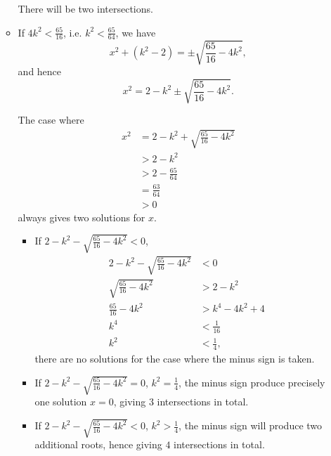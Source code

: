 \begin{enumerate}
\begin{itemize}
                    There will be two intersections.

              \item If \(4k^2 < \frac{65}{16}\), i.e. \(k^2 < \frac{65}{64}\), we have
                    \[
                        x^2 + (k^2 - 2) = \pm \sqrt{\frac{65}{16} - 4k^2},
                    \]
                    and hence
                    \[
                        x^2 = 2 - k^2 \pm \sqrt{\frac{65}{16} - 4k^2}.
                    \]

                    The case where
                    \begin{align*}
                        x^2 & = 2 - k^2 + \sqrt{\frac{65}{16} - 4k^2} \\
                            & > 2 - k^2                               \\
                            & > 2 - \frac{65}{64}                     \\
                            & = \frac{63}{64}                         \\
                            & > 0
                    \end{align*}
                    always gives two solutions for \(x\).

                    \begin{itemize}
                        \item If \(2 - k^2 - \sqrt{\frac{65}{16} - 4k^2} < 0\),
                              \begin{align*}
                                  2 - k^2 - \sqrt{\frac{65}{16} - 4k^2} & < 0              \\
                                  \sqrt{\frac{65}{16} - 4k^2}           & > 2 - k^2        \\
                                  \frac{65}{16} - 4k^2                  & > k^4 - 4k^2 + 4 \\
                                  k^4                                   & < \frac{1}{16}   \\
                                  k^2                                   & < \frac{1}{4},
                              \end{align*}
                              there are no solutions for the case where the minus sign is taken.
                        \item If \(2 - k^2 - \sqrt{\frac{65}{16} - 4k^2} = 0\), \(k^2 = \frac{1}{4}\), the minus sign produce precisely one solution \(x = 0\), giving \(3\) intersections in total.
                        \item If \(2 - k^2 - \sqrt{\frac{65}{16} - 4k^2} < 0\), \(k^2 > \frac{1}{4}\), the minus sign will produce two additional roots, hence giving \(4\) intersections in total.
                    \end{itemize}
          \end{itemize}


\end{enumerate}
